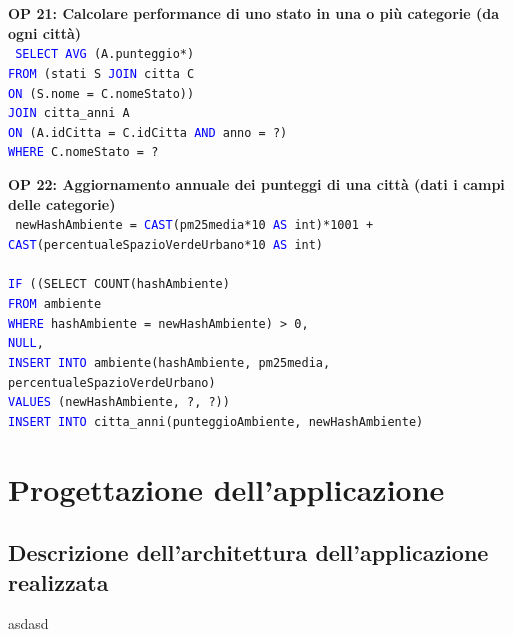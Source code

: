 \documentclass[a4paper,12pt]{report}
\begin{document}
            \noindent
            \textbf{OP 21: Calcolare performance di uno stato in una o più categorie (da ogni città)} \\
            \texttt{
                \textcolor{blue}{SELECT AVG} (A.punteggio*) \\
                \textcolor{blue}{FROM} (stati S \textcolor{blue}{JOIN} citta C \\
                \textcolor{blue}{ON} (S.nome = C.nomeStato)) \\
                \textcolor{blue}{JOIN} citta\_anni A \\
                \textcolor{blue}{ON} (A.idCitta = C.idCitta \textcolor{blue}{AND} anno = ?) \\
                \textcolor{blue}{WHERE} C.nomeStato = ? \\
            }

            \noindent
            \textbf{OP 22: Aggiornamento annuale dei punteggi di una città (dati i campi delle categorie)} \\
            \texttt{
                newHashAmbiente = \textcolor{blue}{CAST}(pm25media*10 \textcolor{blue}{AS} int)*1001 + \textcolor{blue}{CAST}(percentualeSpazioVerdeUrbano*10 \textcolor{blue}{AS} int) \\ \\
                \textcolor{blue}{IF} ((SELECT COUNT(hashAmbiente) \\
                \textcolor{blue}{FROM} ambiente \\
                \textcolor{blue}{WHERE} hashAmbiente = newHashAmbiente) > 0,  \\
                \textcolor{blue}{NULL},  \\
                \textcolor{blue}{INSERT INTO} ambiente(hashAmbiente, pm25media, percentualeSpazioVerdeUrbano) \\
                \textcolor{blue}{VALUES} (newHashAmbiente, ?, ?)) \\
                \textcolor{blue}{INSERT INTO} citta\_anni(punteggioAmbiente, newHashAmbiente) \\
            }

        \chapter{Progettazione dell'applicazione}
            
    	\section{Descrizione dell'architettura dell'applicazione realizzata}
        	asdasd
 
\end{document}
